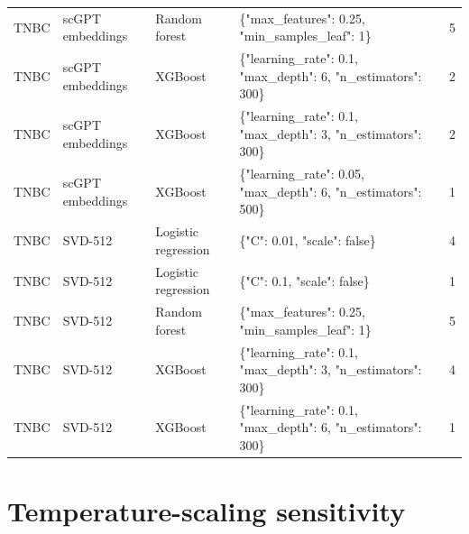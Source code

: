 {\begin{longtable}{lll>{\raggedright\arraybackslash}p{6.8cm}r}
TNBC & scGPT embeddings & Random forest & \{"max\_features": 0.25, "min\_samples\_leaf": 1\} & 5 \\
TNBC & scGPT embeddings & XGBoost & \{"learning\_rate": 0.1, "max\_depth": 6, "n\_estimators": 300\} & 2 \\
TNBC & scGPT embeddings & XGBoost & \{"learning\_rate": 0.1, "max\_depth": 3, "n\_estimators": 300\} & 2 \\
TNBC & scGPT embeddings & XGBoost & \{"learning\_rate": 0.05, "max\_depth": 6, "n\_estimators": 500\} & 1 \\
TNBC & SVD-512 & Logistic regression & \{"C": 0.01, "scale": false\} & 4 \\
TNBC & SVD-512 & Logistic regression & \{"C": 0.1, "scale": false\} & 1 \\
TNBC & SVD-512 & Random forest & \{"max\_features": 0.25, "min\_samples\_leaf": 1\} & 5 \\
TNBC & SVD-512 & XGBoost & \{"learning\_rate": 0.1, "max\_depth": 3, "n\_estimators": 300\} & 4 \\
TNBC & SVD-512 & XGBoost & \{"learning\_rate": 0.1, "max\_depth": 6, "n\_estimators": 300\} & 1 \\
\end{longtable}
}

\clearpage\section{Temperature-scaling sensitivity}

